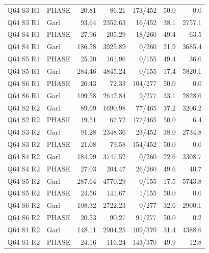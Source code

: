 \begin{longtable}{llrrrrr}
Q64 S3 R1 & PHASE & 20.81 & 86.21 & 173/452 & 50.0 & 0.0 \\
Q64 S3 R1 & Garl & 93.64 & 2352.63 & 16/452 & 38.1 & 2757.1 \\
Q64 S4 R1 & PHASE & 27.96 & 205.29 & 18/260 & 49.4 & 63.5 \\
Q64 S4 R1 & Garl & 186.58 & 3925.89 & 0/260 & 21.9 & 3685.4 \\
Q64 S5 R1 & PHASE & 25.20 & 161.96 & 0/155 & 49.4 & 36.0 \\
Q64 S5 R1 & Garl & 284.46 & 4845.24 & 0/155 & 17.4 & 5820.1 \\
Q64 S6 R1 & PHASE & 20.43 & 72.33 & 104/277 & 50.0 & 0.0 \\
Q64 S6 R1 & Garl & 109.58 & 2642.84 & 9/277 & 33.1 & 2828.6 \\
Q64 S2 R2 & Garl & 89.69 & 1690.98 & 77/465 & 37.2 & 3206.2 \\
Q64 S2 R2 & PHASE & 19.51 & 67.72 & 177/465 & 50.0 & 6.4 \\
Q64 S3 R2 & Garl & 91.28 & 2348.36 & 23/452 & 38.0 & 2734.8 \\
Q64 S3 R2 & PHASE & 21.08 & 79.58 & 154/452 & 50.0 & 0.0 \\
Q64 S4 R2 & Garl & 184.99 & 3747.52 & 0/260 & 22.6 & 3308.7 \\
Q64 S4 R2 & PHASE & 27.03 & 204.47 & 26/260 & 49.6 & 40.7 \\
Q64 S5 R2 & Garl & 287.64 & 4770.29 & 0/155 & 17.5 & 5743.8 \\
Q64 S5 R2 & PHASE & 24.56 & 141.67 & 1/155 & 50.0 & 0.0 \\
Q64 S6 R2 & Garl & 108.32 & 2722.23 & 0/277 & 32.6 & 2900.1 \\
Q64 S6 R2 & PHASE & 20.53 & 90.27 & 91/277 & 50.0 & 0.2 \\
Q64 S1 R2 & Garl & 148.11 & 2904.25 & 109/370 & 31.4 & 4388.6 \\
Q64 S1 R2 & PHASE & 24.16 & 116.24 & 143/370 & 49.9 & 12.8 \\
\bottomrule
\end{longtable}
